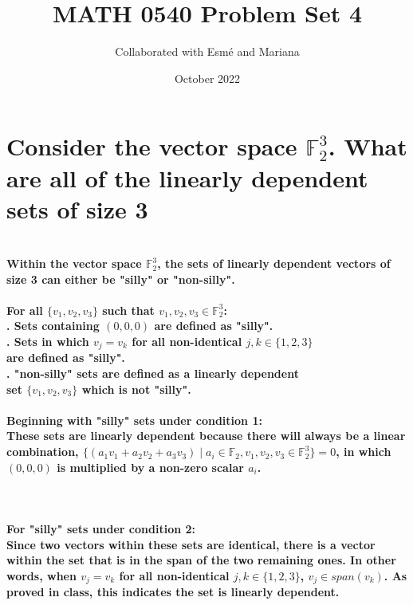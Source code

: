 \documentclass{article}
\title{MATH 0540 Problem Set 4}
\author{Collaborated with Esmé and Mariana}
\date{October 2022}
\begin{document}
\maketitle

\section{Consider the vector space $\mathbb{F}_2^3$. What are all of the linearly dependent sets of size 3}

\paragraph{\large
\\Within the vector space $\mathbb{F}_2^3$, the sets of linearly dependent vectors of size 3 can either be "silly" or "non-silly".}

\paragraph{\large
For all $\{v_1, v_2, v_3\}$ such that $v_1, v_2, v_3 \in \mathbb{F}_2^3$:\\. Sets containing $(0, 0, 0)$ are defined as "silly".
\\. Sets in which $v_j = v_k$ for all non-identical $j,k \in \{1, 2, 3\}$
\\\indent\quad\thinspace are defined as "silly".
\\. "non-silly" sets are defined as a linearly dependent 
\\\indent\quad\thinspace set $\{v_1, v_2, v_3\}$ which is not "silly".}

\paragraph{\large
Beginning with "silly" sets under condition 1:
\\These sets are linearly dependent because there will always be a linear combination, $\{(a_{1}v_{1} + a_{2}v_{2} + a_{3}v_{3})\;|\;a_i \in \mathbb{F}_2, v_1,v_2,v_3 \in \mathbb{F}_2^3\} = 0$, in which $(0, 0, 0)$ is multiplied by a non-zero scalar $a_i$.}\

\paragraph{\large
For "silly" sets under condition 2:
\\Since two vectors within these sets are identical, there is a vector within the set that is in the span of the two remaining ones. In other words, when $v_j = v_k$ for all non-identical $j,k \in \{1, 2, 3\}$, $v_j \in span(v_k)$. As proved in class, this indicates the set is linearly dependent.}
\end{document}

